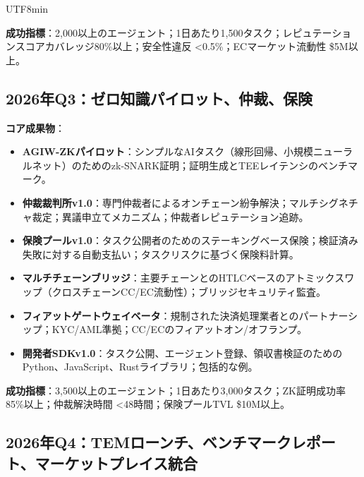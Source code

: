 \documentclass[11pt]{article}
\begin{document}
\begin{CJK}{UTF8}{min}
\begin{itemize}[noitemsep]
\textbf{成功指標}：2,000以上のエージェント；1日あたり1,500タスク；レピュテーションスコアカバレッジ80\%以上；安全性違反 <0.5\%；ECマーケット流動性 \$5M以上。

\subsection{2026年Q3：ゼロ知識パイロット、仲裁、保険}

\textbf{コア成果物}：
\begin{itemize}[noitemsep]
  \item \textbf{AGIW-ZKパイロット}：シンプルなAIタスク（線形回帰、小規模ニューラルネット）のためのzk-SNARK証明；証明生成とTEEレイテンシのベンチマーク。
  \item \textbf{仲裁裁判所v1.0}：専門仲裁者によるオンチェーン紛争解決；マルチシグネチャ裁定；異議申立てメカニズム；仲裁者レピュテーション追跡。
  \item \textbf{保険プールv1.0}：タスク公開者のためのステーキングベース保険；検証済み失敗に対する自動支払い；タスクリスクに基づく保険料計算。
  \item \textbf{マルチチェーンブリッジ}：主要チェーンとのHTLCベースのアトミックスワップ（クロスチェーンCC/EC流動性）；ブリッジセキュリティ監査。
  \item \textbf{フィアットゲートウェイベータ}：規制された決済処理業者とのパートナーシップ；KYC/AML準拠；CC/ECのフィアットオン/オフランプ。
  \item \textbf{開発者SDKv1.0}：タスク公開、エージェント登録、領収書検証のためのPython、JavaScript、Rustライブラリ；包括的な例。
\end{itemize}

\textbf{成功指標}：3,500以上のエージェント；1日あたり3,000タスク；ZK証明成功率85\%以上；仲裁解決時間 <48時間；保険プールTVL \$10M以上。

\subsection{2026年Q4：TEMローンチ、ベンチマークレポート、マーケットプレイス統合}


\end{itemize}
\end{CJK}
\end{document}
